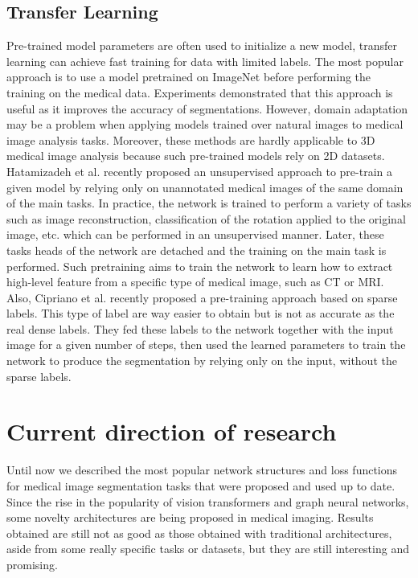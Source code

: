 \subsection{Transfer Learning}
Pre-trained model parameters are often used to initialize a new model,
transfer learning can achieve fast training for data with limited labels. The
most popular approach is to use a model pretrained on ImageNet before performing
the training on the medical data. Experiments demonstrated that this approach is
useful as it improves the accuracy of segmentations. However, domain
adaptation may be a problem when applying models trained over natural images to
medical image analysis tasks. Moreover, these methods are hardly applicable to
3D medical image analysis because such pre-trained models rely on 2D datasets.\\
Hatamizadeh et al. recently proposed an unsupervised approach to pre-train a
given model by relying only on unannotated medical images of the same domain of
the main tasks. In practice, the network is trained to perform a variety of tasks
such as image reconstruction, classification of the rotation applied to the
original image, etc. which can be performed in an unsupervised manner. Later,
these tasks heads of the network are detached and the training on the main task
is performed. Such pretraining aims to train the network to learn how to extract
high-level feature from a specific type of medical image, such as CT or MRI.\\
Also, Cipriano et al. recently proposed a pre-training approach based on sparse labels.
This type of label are way easier to obtain but is not as accurate as the
real dense labels. They fed these labels to the network together with the input
image for a given number of steps, then used the learned parameters to train the
network to produce the segmentation by relying only on the input, without the
sparse labels.


\section{Current direction of research}
Until now we described the most popular network structures and loss functions
for medical image segmentation tasks that were proposed and used up to date.
Since the rise in the popularity of vision transformers and graph neural networks,
some novelty architectures are being proposed in medical imaging. Results
obtained are still not as good as those obtained with traditional architectures,
aside from some really specific tasks or datasets, but they are still interesting and
promising.\\

